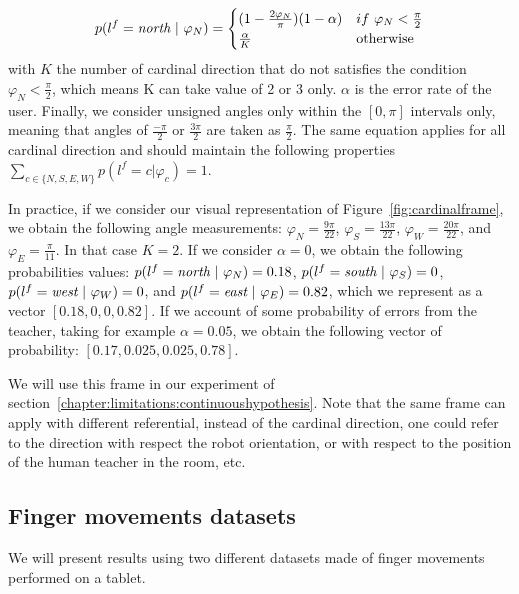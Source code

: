 \begin{equation}
    p(l^f = \emph{north}~|~\varphi_N) = 
    \begin{cases}
    (1 - \frac{2 \varphi_N}{\pi}) (1-\alpha) & if~\varphi_N < \frac{\pi}{2}\\
        \frac{\alpha}{K}  & \text{otherwise}\\
   \end{cases}
   \label{eq:cardinalframe}
\end{equation}
with $K$ the number of cardinal direction that do not satisfies the condition $\varphi_N < \frac{\pi}{2}$, which means K can take value of 2 or 3 only. $\alpha$ is the error rate of the user. Finally, we consider unsigned angles only within the $[0, \pi]$ intervals only, meaning that angles of $\frac{-\pi}{2}$ or $\frac{3\pi}{2}$ are taken as $\frac{\pi}{2}$. The same equation applies for all cardinal direction and should maintain the following properties $\sum_{c \in \{N,S,E,W\}} p(l^f = c |\varphi_c) = 1$.

In practice, if we consider our visual representation of Figure~\ref{fig:cardinalframe}, we obtain the following angle measurements: $\varphi_N = \frac{9\pi}{22}$, $\varphi_S = \frac{13\pi}{22}$, $\varphi_W = \frac{20\pi}{22}$, and $\varphi_E = \frac{\pi}{11}$. In that case $K = 2$. If we consider $\alpha = 0$, we obtain the following probabilities values: $p(l^f = \emph{north}~|~\varphi_N) = 0.18$, $p(l^f = \emph{south}~|~\varphi_S) = 0$, $p(l^f = \emph{west}~|~\varphi_W) = 0$, and $p(l^f = \emph{east}~|~\varphi_E) = 0.82$, which we represent as a vector $[0.18,0,0,0.82]$. If we account of some probability of errors from the teacher, taking for example $\alpha = 0.05$, we obtain the following vector of probability: $[0.17, 0.025, 0.025,0.78]$.

We will use this frame in our experiment of section~\ref{chapter:limitations:continuoushypothesis}. Note that the same frame can apply with different referential, instead of the cardinal direction, one could refer to the direction with respect the robot orientation, or with respect to the position of the human teacher in the room, etc.

\subsection{Finger movements datasets}

We will present results using two different datasets made of finger movements performed on a tablet. 

